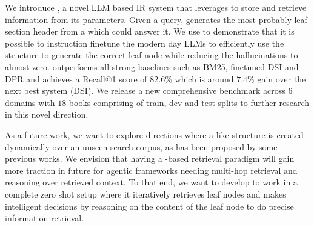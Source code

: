 We introduce {\sys}, a novel LLM based IR system that leverages {\toc} to store and retrieve information from its parameters. Given a query, {\sys} generates the most probably leaf section header from a {\toc} which could answer it. We use {\basellm} to demonstrate that it is possible to instruction finetune the modern day LLMs to efficiently use the {\toc} structure to generate the correct leaf node while reducing the hallucinations to almost zero. {\sys} outperforms all strong baselines such as BM25, finetuned DSI and DPR and achieves a Recall@1 score of 82.6\% which is around $7.4\%$ gain over the next best system (DSI). We release a new comprehensive benchmark {\ben} across $6$ domains with $18$ books comprising of train, dev and test splits to further research in this novel direction.

As a future work, we want to explore directions where a {\toc} like structure is created dynamically over an unseen search corpus, as has been proposed by some previous works. We envision that having a {\toc}-based retrieval paradigm will gain more traction in future for agentic frameworks needing multi-hop retrieval and reasoning over retrieved context. To that end, we want to develop {\sys} to work in a complete zero shot setup where it iteratively retrieves {\toc} leaf nodes and makes intelligent decisions by reasoning on the content of the leaf node to do precise information retrieval. 